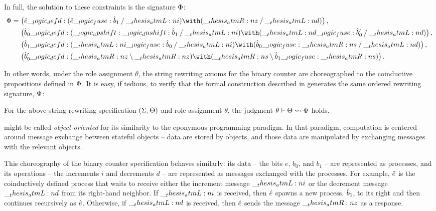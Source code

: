 %
In full, the solution to these constraints is the signature $\Phi$:
\begin{equation*}
  \orsig =
  \begin{lgathered}[t]
    \bigl(\defp{e} \defd (\defp{e} \fuse \defp{b}_1 \pmir \atmL{i}) \with (\atmR{z} \pmir \atmL{d})\bigr) \,, \\
    \bigl(\defp{b}_0 \defd (\up \dn \defp{b}_1 \pmir \atmL{i}) \with (\atmL{d} \fuse \defp{b}'_0 \pmir \atmL{d})\bigr) \,, \\
    \bigl(\defp{b}_1 \defd (\atmL{i} \fuse \defp{b}_0 \pmir \atmL{i}) \with (\defp{b}_0 \fuse \atmR{s} \pmir \atmL{d})\bigr) \,, \\
    \bigl(\defp{b}'_0 \defd (\atmR{z} \limp \atmR{z}) \with (\atmR{s} \limp \defp{b}_1 \fuse \atmR{s})\bigr)
  \,.
  \end{lgathered}
\end{equation*}



In other words, under the role assignment $\theta$, the string rewriting axioms for the binary counter are choreographed to the coinductive propositions defined in $\Phi$.
It is easy, if tedious, to verify that 
the formal construction described in  generates the same ordered rewriting signature, $\Phi$:
%
\begin{proposition}
  For the above string rewriting specification $(\Sigma, \Theta)$ and role assignment $\theta$, the judgment $\theta \vdash \Theta \rightsquigarrow \Phi$ holds.
\end{proposition}

 might be called \emph{object-oriented} for its similarity to the eponymous programming paradigm.
In that paradigm, computation is centered around message exchange between stateful objects -- data are stored by objects, and those data are manipulated by exchanging messages with the relevant objects.

This choreography of the binary counter specification behaves similarly:
its data -- the bits $e$, $b_0$, and $b_1$ -- are represented as processes, and its operations -- the increments $i$ and decrements $d$ -- are represented as messages exchanged with the processes.
%
%
For example, $\hat{e}$ is the coinductively defined process that waits to receive either the increment message $\__thesis_atmL:n {i}$ or the decrement message $\__thesis_atmL:n {d}$ from its right-hand neighbor.
If $\__thesis_atmL:n {i}$ is received, then $\hat{e}$ spawns a new process, $\hat{b}_1$, to its right and then continues recursively as $\hat{e}$.
Otherwise, if $\__thesis_atmL:n {d}$ is received, then $\hat{e}$ sends the message $\__thesis_atmR:n {z}$ as a response.


